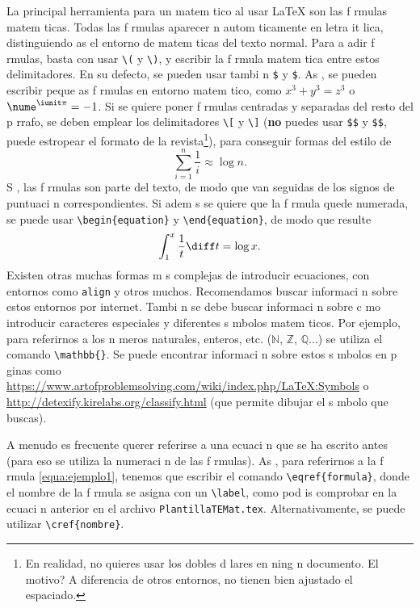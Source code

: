 \documentclass{article}
\begin{document}
La principal herramienta para un matem tico al usar \LaTeX{} son las f rmulas matem ticas.
Todas las f rmulas aparecer n autom ticamente en letra it lica, distinguiendo as  el entorno de matem ticas del texto normal.
Para a adir f rmulas, basta con usar \verb+\(+ y \verb+\)+, y escribir la f rmula matem tica entre estos delimitadores.
En su defecto, se pueden usar tambi n \verb+$+ y \verb+$+.
As , se pueden escribir peque as f rmulas en entorno matem tico, como \(x^3+y^3=z^3\) o $\nume^{\iunit\pi}=-1$.
Si se quiere poner f rmulas centradas y separadas del resto del p rrafo, se deben emplear los delimitadores \verb+\[+ y \verb+\]+ (\textbf{no} puedes usar \verb+$$+ y \verb+$$+, puede estropear el formato de la revista\footnote{En realidad, no quieres usar los dobles d lares en ning n documento.  El motivo? A diferencia de otros entornos, no tienen bien ajustado el espaciado.}), para conseguir formas del estilo de
\[\sum_{i=1}^n\frac{1}{i}\approx\log n.\]
S , las f rmulas son parte del texto, de modo que van seguidas de los signos de puntuaci n correspondientes.
Si adem s se quiere que la f rmula quede numerada, se puede usar \verb+\begin{equation}+ y \verb+\end{equation}+, de modo que resulte
\begin{equation}\label{equa:ejemplo1}
\int_{1}^x\frac{1}{t} \diff t = \log x.
\end{equation}
Existen otras muchas formas m s complejas de introducir ecuaciones, con entornos como \verb+align+ y otros muchos.
Recomendamos buscar informaci n sobre estos entornos por internet.
Tambi n se debe buscar informaci n sobre c mo introducir caracteres especiales y diferentes s mbolos matem ticos.
Por ejemplo, para referirnos a los n meros naturales, enteros, etc. ($\mathbb{N}$, $\mathbb{Z}$, $\mathbb{Q}$...) se utiliza el comando \verb+\mathbb{}+.
Se puede encontrar informaci n sobre estos s mbolos en p ginas como \url{https://www.artofproblemsolving.com/wiki/index.php/LaTeX:Symbols} o \url{http://detexify.kirelabs.org/classify.html} (que permite dibujar el s mbolo que buscas).

A menudo es frecuente querer referirse a una ecuaci n que se ha escrito antes (para eso se utiliza la numeraci n de las f rmulas).
As , para referirnos a la f rmula \eqref{equa:ejemplo1}, tenemos que escribir el comando \verb+\eqref{formula}+, donde el nombre de la f rmula se asigna con un \verb+\label+, como pod is comprobar en la ecuaci n anterior en el archivo \verb+PlantillaTEMat.tex+.
Alternativamente, se puede utilizar \verb+\cref{nombre}+.
\end{document}
